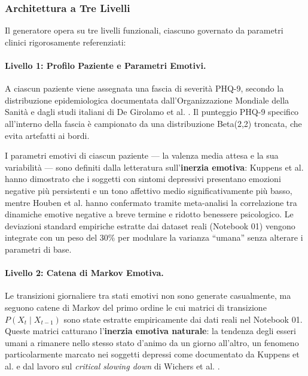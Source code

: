 \subsubsection{Architettura a Tre Livelli}

Il generatore opera su tre livelli funzionali, ciascuno governato da parametri clinici rigorosamente referenziati:

\paragraph{Livello 1: Profilo Paziente e Parametri Emotivi.}
A ciascun paziente viene assegnata una fascia di severità PHQ-9, secondo la distribuzione epidemiologica documentata dall'Organizzazione Mondiale della Sanità \cite{who2023depression} e dagli studi italiani di De Girolamo et al. \cite{degirolamo2020mental}. Il punteggio PHQ-9 specifico all'interno della fascia è campionato da una distribuzione Beta(2,2) troncata, che evita artefatti ai bordi.

I parametri emotivi di ciascun paziente --- la valenza media attesa e la sua variabilità --- sono definiti dalla letteratura sull'\textbf{inerzia emotiva}: Kuppens et al. \cite{kuppens2010inertia} hanno dimostrato che i soggetti con sintomi depressivi presentano emozioni negative più persistenti e un tono affettivo medio significativamente più basso, mentre Houben et al. \cite{houben2015emotion} hanno confermato tramite meta-analisi la correlazione tra dinamiche emotive negative a breve termine e ridotto benessere psicologico. Le deviazioni standard empiriche estratte dai dataset reali (Notebook 01) vengono integrate con un peso del 30\% per modulare la varianza ``umana'' senza alterare i parametri di base.

\paragraph{Livello 2: Catena di Markov Emotiva.}
Le transizioni giornaliere tra stati emotivi non sono generate casualmente, ma seguono catene di Markov del primo ordine le cui matrici di transizione $P(X_t \mid X_{t-1})$ sono state estratte empiricamente dai dati reali nel Notebook 01. Queste matrici catturano l'\textbf{inerzia emotiva naturale}: la tendenza degli esseri umani a rimanere nello stesso stato d'animo da un giorno all'altro, un fenomeno particolarmente marcato nei soggetti depressi come documentato da Kuppens et al. \cite{kuppens2010inertia} e dal lavoro sul \textit{critical slowing down} di Wichers et al. \cite{wichers2016critical}.

